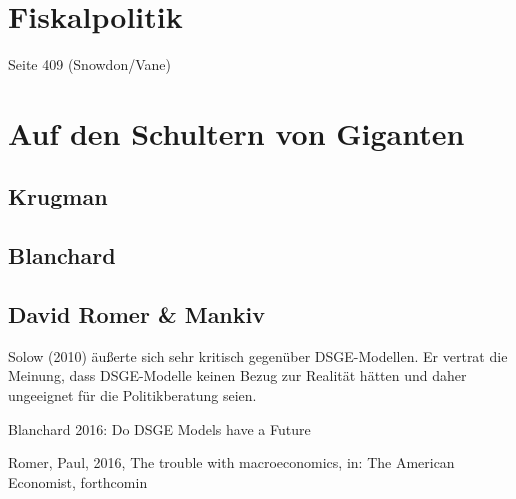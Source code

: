 \section{Fiskalpolitik}

Seite 409 (Snowdon/Vane)


\section{Auf den Schultern von Giganten}
\label{Giganten}

\subsection{Krugman}

\subsection{Blanchard}

\subsection{David Romer \& Mankiv}





Solow (2010) äußerte sich sehr kritisch gegenüber DSGE-Modellen. Er vertrat die Meinung, dass 
DSGE-Modelle keinen Bezug zur Realität hätten und daher ungeeignet für die Politikberatung 
seien.


Blanchard 2016: Do DSGE Models have a Future

Romer, Paul, 2016, The trouble with macroeconomics, in: The American Economist, forthcomin










